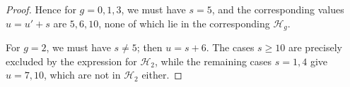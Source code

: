 \documentclass[10pt,a4paper]{amsart}
\begin{document}
\begin{proof}
    Hence for $g=0,1,3$, we must have $s=5$, and the corresponding values $u=u'+s$ are $5,6,10$, none of which lie in the corresponding $\mathcal{H}_g$.

    For $g=2$, we must have $s\neq 5$; then $u=s+6$. 
    The cases $s\geq 10$ are precisely excluded by the expression for $\mathcal{H}_2$, while the remaining cases $s=1,4$ give $u=7,10$, which are not in $\mathcal{H}_2$ either.
\end{proof}
\end{document}
